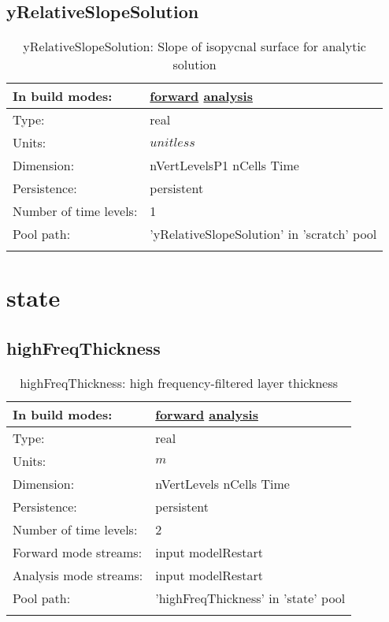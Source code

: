 \subsection[yRelativeSlopeSolution]{yRelativeSlopeSolution}
\label{subsec:var_sec_scratch_yRelativeSlopeSolution}
\begin{center}
\begin{longtable}{| p{2.0in} | p{4.0in} |}
        \hline 
        In build modes: & \hyperref[subsec:forward_var_tab_scratch]{forward} \hyperref[subsec:analysis_var_tab_scratch]{analysis} \\
        \hline 
        Type: & real \\
        \hline 
        Units: & $unitless$ \\
        \hline 
        Dimension: & nVertLevelsP1 nCells Time \\
        \hline 
        Persistence: & persistent \\
        \hline 
        Number of time levels: & 1 \\
        \hline 
            Pool path: & 'yRelativeSlopeSolution' in 'scratch' pool
 \\
		 \hline 
    \caption{yRelativeSlopeSolution: Slope of isopycnal surface for analytic solution}
\end{longtable}
\end{center}
\section[state]{state}
\label{sec:var_sec_state}
\subsection[highFreqThickness]{highFreqThickness}
\label{subsec:var_sec_state_highFreqThickness}
\begin{center}
\begin{longtable}{| p{2.0in} | p{4.0in} |}
        \hline 
        In build modes: & \hyperref[subsec:forward_var_tab_state]{forward} \hyperref[subsec:analysis_var_tab_state]{analysis} \\
        \hline 
        Type: & real \\
        \hline 
        Units: & $m$ \\
        \hline 
        Dimension: & nVertLevels nCells Time \\
        \hline 
        Persistence: & persistent \\
        \hline 
        Number of time levels: & 2 \\
        \hline 
		 Forward mode streams: &  input modelRestart \\
        \hline 
		 Analysis mode streams: &  input modelRestart \\
        \hline 
            Pool path: & 'highFreqThickness' in 'state' pool
 \\
		 \hline 
    \caption{highFreqThickness: high frequency-filtered layer thickness}
\end{longtable}
\end{center}
